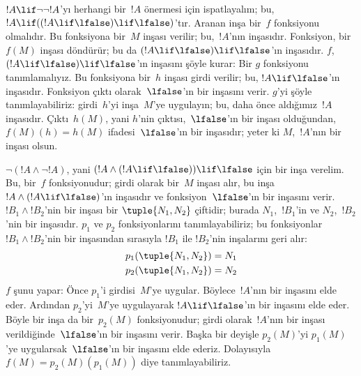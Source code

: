 \documentclass[../../../include/open-logic-section]{subfiles}
\begin{document}
\begin{ex}
$!A \lif \lnot \lnot !A$'yı herhangi bir~$!A$ önermesi için ispatlayalım;
bu, $!A \lif ((!A \lif \lfalse) \lif \lfalse)$'tır. Aranan inşa bir~$f$
fonksiyonu olmalıdır. Bu fonksiyona bir~$M$ inşası verilir; bu,~$!A$'nın
inşasıdır. Fonksiyon, bir~$f(M)$ inşası döndürür; bu da $(!A \lif \lfalse)
\lif \lfalse$'ın inşasıdır. $f$, $(!A \lif \lfalse) \lif \lfalse$'ın
inşasını şöyle kurar: Bir $g$ fonksiyonu tanımlamalıyız. Bu fonksiyona bir~$h$
inşası girdi verilir; bu, $!A \lif \lfalse$'ın inşasıdır. Fonksiyon çıktı
olarak~$\lfalse$'ın bir inşasını verir. $g$'yi şöyle tanımlayabiliriz:
girdi~$h$'yi inşa~$M$'ye uygulayın; bu, daha önce aldığımız~$!A$ inşasıdır.
Çıktı~$h(M)$, yani $h$'nin çıktısı,~$\lfalse$'ın bir inşası olduğundan,
$f(M)(h) = h(M)$ ifadesi~$\lfalse$'ın bir inşasıdır; yeter ki $M$,~$!A$'nın
bir inşası olsun.
\end{ex}

\begin{ex}
$\lnot(!A \land \lnot !A)$, yani $(!A \land (!A \lif \lfalse)) \lif
\lfalse$ için bir inşa verelim. Bu, bir~$f$ fonksiyonudur; girdi olarak
bir~$M$ inşası alır, bu inşa $!A \land (!A \lif \lfalse)$'ın inşasıdır ve
fonksiyon~$\lfalse$'ın bir inşasını verir. $!B_1 \land !B_2$'nin bir inşası
bir $\tuple{N_1, N_2}$ çiftidir; burada $N_1$,~$!B_1$'in ve $N_2$,~$!B_2$'nin
bir inşasıdır. $p_1$ ve $p_2$ fonksiyonlarını tanımlayabiliriz; bu fonksiyonlar
$!B_1 \land !B_2$'nin bir inşasından sırasıyla $!B_1$ ile $!B_2$'nin
inşalarını geri alır:
\begin{align*}
  p_1(\tuple{N_1, N_2}) &= N_1\\
  p_2(\tuple{N_1, N_2}) &= N_2
\end{align*}
$f$ şunu yapar: Önce $p_1$'i girdisi~$M$'ye uygular. Böylece~$!A$'nın bir
inşasını elde eder. Ardından $p_2$'yi~$M$'ye uygulayarak $!A \lif \lfalse$'ın
bir inşasını elde eder. Böyle bir inşa da bir~$p_2(M)$ fonksiyonudur; girdi
olarak~$!A$'nın bir inşası verildiğinde~$\lfalse$'ın bir inşasını verir. Başka
bir deyişle $p_2(M)$'yi $p_1(M)$'ye uygularsak~$\lfalse$'ın bir inşasını elde
ederiz. Dolayısıyla $f(M) = p_2(M)(p_1(M))$ diye tanımlayabiliriz.
\end{ex}
\end{document}
